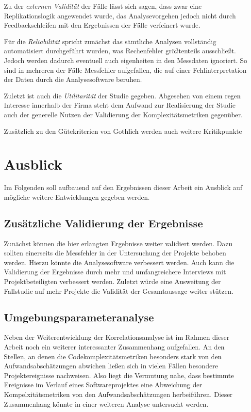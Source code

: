 Zu der \emph{externen Validität} der Fälle lässt sich sagen, dass zwar
eine Replikationslogik angewendet wurde, das Analysevorgehen jedoch
nicht durch Feedbackschleifen mit den Ergebnissen der Fälle verfeinert
wurde.

Für die \emph{Reliabilität} spricht zunächst das sämtliche Analysen
vollständig automatisiert durchgeführt wurden, was Rechenfehler
grö\ss tenteils ausschlie\ss t. Jedoch werden dadurch eventuell auch
eigenheiten in den Messdaten ignoriert. So sind in mehreren der Fälle
Messfehler aufgefallen, die auf einer Fehlinterpretation der Daten durch
die Analysesoftware beruhen.

Zuletzt ist auch die \emph{Utilitarität} der Studie gegeben. Abgesehen
von einem regen Interesse innerhalb der Firma steht dem Aufwand zur
Realisierung der Studie auch der generelle Nutzen der Validierung der
Komplexitätsmetriken gegenüber.

Zusätzlich zu den Gütekriterien von Gothlich werden auch weitere
Kritikpunkte

\section{Ausblick}\label{Ausblick}

Im Folgenden soll aufbauend auf den Ergebnissen dieser Arbeit ein
Ausblick auf mögliche weitere Entwicklungen gegeben werden.

\subsection{Zusätzliche Validierung der Ergebnisse}\label{Zusatzliche-Validierung-der-Ergebnisse}

Zunächst können die hier erlangten Ergebnisse weiter validiert werden.
Dazu sollten einerseits die Messfehler in der Untersuchung der Projekte
behoben werden. Hierzu könnte die Analysesoftware verbessert werden.
Auch kann die Validierung der Ergebnisse durch mehr und umfangreichere
Interviews mit Projektbeteiligten verbessert werden. Zuletzt würde eine
Ausweitung der Fallstudie auf mehr Projekte die Validität der
Gesamtaussage weiter stützen.

\subsection{Umgebungsparameteranalyse}\label{Umgebungsparameteranalyse}

Neben der Weiterentwicklung der Korrelationsanalyse ist im Rahmen dieser
Arbeit noch ein weiterer interessanter Zusammenhang aufgefallen. An den
Stellen, an denen die Codekomplexitätsmetriken besonders stark von den
Aufwandsabschätzungen abwichen lie\ss en sich in vielen Fällen besondere
Projektereignisse nachweisen. Also liegt die Vermutung nahe, dass
bestimmte Ereignisse im Verlauf eines Softwareprojektes eine Abweichung
der Kompelxitätsmetriken von den Aufwandsabschätzungen herbeiführen.
Dieser Zusammenhang könnte in einer weiteren Analyse untersucht werden.

